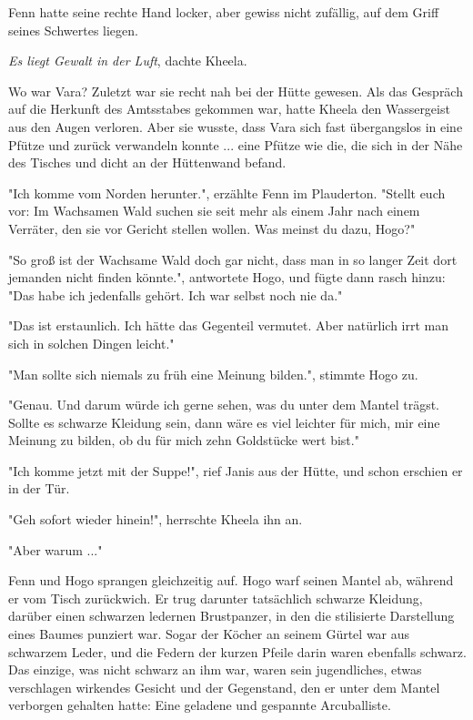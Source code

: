 \documentclass[10pt, a4paper, oneside]{book}
\begin{document}
\begin{multicols}{2}
Fenn hatte seine rechte Hand locker, aber gewiss nicht zufällig, auf dem Griff seines Schwertes liegen. 

\textit{Es liegt Gewalt in der Luft}, dachte Kheela. 

Wo war Vara? Zuletzt war sie recht nah bei der Hütte gewesen. Als das Gespräch auf die Herkunft des Amtsstabes gekommen war, hatte Kheela den Wassergeist aus den Augen verloren. Aber sie wusste, dass Vara sich fast übergangslos in eine Pfütze und zurück verwandeln konnte ... eine Pfütze wie die, die sich in der Nähe des Tisches und dicht an der Hüttenwand befand. 

"Ich komme vom Norden herunter.", erzählte Fenn im Plauderton. "Stellt euch vor: Im Wachsamen Wald suchen sie seit mehr als einem Jahr nach einem Verräter, den sie vor Gericht stellen wollen. Was meinst du dazu, Hogo?" 

"So groß ist der Wachsame Wald doch gar nicht, dass man in so langer Zeit dort jemanden nicht finden könnte.", antwortete Hogo, und fügte dann rasch hinzu: "Das habe ich jedenfalls gehört. Ich war selbst noch nie da." 

"Das ist erstaunlich. Ich hätte das Gegenteil vermutet. Aber natürlich irrt man sich in solchen Dingen leicht." 

"Man sollte sich niemals zu früh eine Meinung bilden.", stimmte Hogo zu. 

"Genau. Und darum würde ich gerne sehen, was du unter dem Mantel trägst. Sollte es schwarze Kleidung sein, dann wäre es viel leichter für mich, mir eine Meinung zu bilden, ob du für mich zehn Goldstücke wert bist." 

"Ich komme jetzt mit der Suppe!", rief Janis aus der Hütte, und schon erschien er in der Tür. 

"Geh sofort wieder hinein!", herrschte Kheela ihn an. 

"Aber warum ..." 

Fenn und Hogo sprangen gleichzeitig auf. Hogo warf seinen Mantel ab, während er vom Tisch zurückwich. Er trug darunter tatsächlich schwarze Kleidung, darüber einen schwarzen ledernen Brustpanzer, in den die stilisierte Darstellung eines Baumes punziert war. Sogar der Köcher an seinem Gürtel war aus schwarzem Leder, und die Federn der kurzen Pfeile darin waren ebenfalls schwarz. Das einzige, was nicht schwarz an ihm war, waren sein jugendliches, etwas verschlagen wirkendes Gesicht und der Gegenstand, den er unter dem Mantel verborgen gehalten hatte: Eine geladene und gespannte Arcuballiste. 


\end{multicols}
\end{document}
